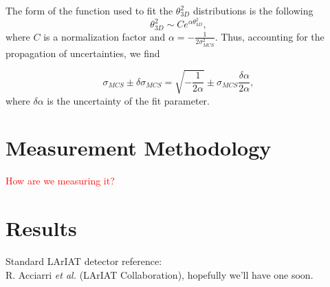 \documentclass[aps,prl,twocolumn,showpacs,superscriptaddress,groupedaddress]{revtex4}  %
\begin{document}
The form of the function used to fit the $\theta^2_{3D}$ distributions is the following
\begin{equation}
\theta^2_{3D}  \sim   C e^{\alpha \theta^2_{3D}},
\end{equation}
where $C$ is a normalization factor and $\alpha = -\frac{1}{2\sigma^2_{MCS}}$. Thus, accounting for the propagation of uncertainties, we find

\begin{equation}
\sigma_{MCS} \pm \delta \sigma_{MCS}=  \sqrt{ -\frac{1}{2\alpha} } \pm \sigma_{MCS} \frac{\delta\alpha}{2\alpha},
\end{equation}
where $\delta\alpha$ is the uncertainty of the fit parameter.


\section{\label{sec:Method}  Measurement Methodology}
\textcolor{red}{How are we measuring it?}


\section{\label{sec:ResultsMu} Results}





\begin{thebibliography}{99}

    Standard LArIAT detector reference:  \\
R. Acciarri {\sl et al.} (LArIAT Collaboration),
hopefully we'll have one soon.

 \end{thebibliography}
\end{document}
